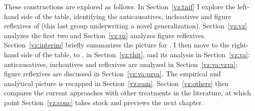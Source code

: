 These constructions are explored as follows. In Section~\ref{vz:tnif} I explore the left-hand side of the table, identifying the anticausatives, inchoatives and figure reflexives of {\tnif} (this last group underwriting a novel generalization). Section~\ref{vz:vz} analyzes the first two and Section~\ref{vz:pz} analyzes figure reflexives. Section~\ref{vz:interim} briefly summarizes the picture for {\tnif}. I then move to the right-hand side of the table, to {\thit}, in Section~\ref{vz:thit}, and its analysis in Section~\ref{vz:va}: anticausatives, inchoatives and reflexives are analyzed in Section~\ref{vz:va:vzva}; figure reflexives are discussed in Section~\ref{vz:va:pzva}. The empirical and analytical picture is recapped in Section~\ref{vz:sum}. Section~\ref{vz:others} then compares the current approaches with other treatments in the literature, at which point Section~\ref{vz:conc} takes stock and previews the next chapter.



